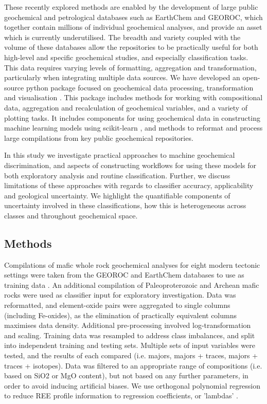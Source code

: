 \documentclass[a4,10pt]{article}
\begin{document}
\begin{multicols*}{2}[]
	These recently explored methods are enabled by the development of large public geochemical and petrological databases such as EarthChem \citep[][]{Lehnert2000} and GEOROC, which  together contain millions of individual geochemical analyses, and provide an asset which is currently underutilised. The breadth and variety coupled with the volume of these databases allow the repositories to be practically useful for both high-level and specific geochemical studies, and especially classification tasks. This data requires varying levels of formatting, aggregation and transformation, particularly when integrating multiple data sources. We have developed an open-source python package focused on geochemical data processing, transformation and visualisation  \citep[][]{Williams2019}. This package includes methods for working with compositional data, aggregation and recalculation of geochemical variables, and a variety of plotting tasks. It includes components for using geochemical data in constructing machine learning models using scikit-learn \citep[][]{Pedregosa2011}, and methods to reformat and process large compilations from key public geochemical repositories.
	
	In this study we investigate practical approaches to machine geochemical discrimination, and aspects of constructing workflows for using these models for both exploratory analysis and routine classification. Further, we discuss limitations of these approaches with regards to classifier accuracy, applicability and geological uncertainty. We highlight the quantifiable components of uncertainty involved in these classifications, how this is heterogeneous across classes and throughout geochemical space.
	
	\subsection*{Methods}
	
	Compilations of mafic whole rock geochemical analyses for eight modern tectonic settings were taken from the GEOROC and EarthChem databases to use as training data \citep[chosen for comparability to][, although extending the volume of data significantly]{Petrelli2016,Ueki2018}. An additional compilation of Paleoproterozoic and Archean mafic rocks were used as classifier input for exploratory investigation. Data was reformatted, and element-oxide pairs were aggregated to single columns (including Fe-oxides), as the elimination of practically equivalent columns maximises data density. Additional pre-processing involved log-transformation and scaling. Training data was resampled to address class imbalances, and split into independent training and testing sets. Multiple sets of input variables were tested, and the results of each compared (i.e. majors, majors + traces, majors + traces + isotopes). Data was filtered to an appropriate range of compositions (i.e. based on SiO2 or MgO content), but not based on any further parameters, in order to avoid inducing artificial biases. We use orthogonal polynomial regression to reduce REE profile information to regression coefficients, or 'lambdas' \citep[][]{ONeill2016}.
	

\end{multicols*}
\end{document}
